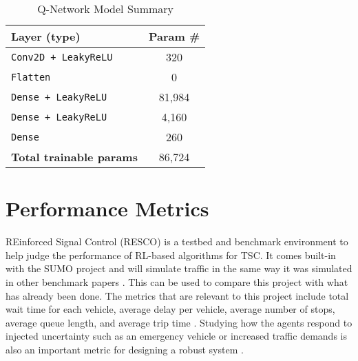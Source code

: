 \documentclass[letterpaper]{article} %
\begin{document}
\begin{table}[h]
\centering
\begin{tabular}{lc}
\hline
\textbf{Layer (type)}              & \textbf{Param \#} \\ \hline
\texttt{Conv2D + LeakyReLU}        & 320       \\
\texttt{Flatten}                   & 0         \\
\texttt{Dense + LeakyReLU}         & 81,984    \\
\texttt{Dense + LeakyReLU}         & 4,160     \\
\texttt{Dense}                     & 260       \\ \hline
\textbf{Total trainable params}    & 86,724    \\ \hline
\end{tabular}
\caption{Q-Network Model Summary}
\label{tab:model_summary}
\end{table}

\section{Performance Metrics}
REinforced Signal Control (RESCO) is a testbed and benchmark environment to help judge the performance of RL-based algorithms for TSC. It comes built-in with the SUMO project and will simulate traffic in the same way it was simulated in other benchmark papers \cite{ault2021reinforcement}. This can be used to compare this project with what has already been done.
The metrics that are relevant to this project include total wait time for each vehicle, average delay per vehicle, average number of stops, average queue length, and average trip time \cite{Reza2023}.
Studying how the agents respond to injected uncertainty such as an emergency vehicle or increased traffic demands is also an important metric for designing a robust system \cite{DBLP:journals/corr/abs-2004-04778}.


\end{document}
